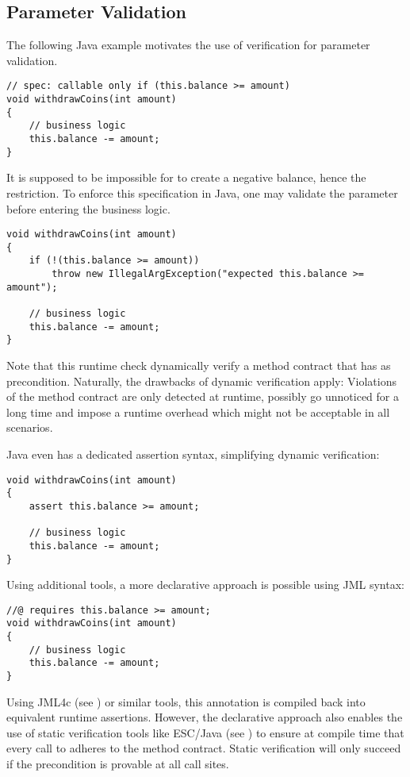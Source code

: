 
\subsection{Parameter Validation}
\label{ssec:argument-validation}
The following Java example motivates the use of verification for parameter validation.
\begin{lstlisting}
// spec: callable only if (this.balance >= amount)
void withdrawCoins(int amount)
{
    // business logic
    this.balance -= amount;
}
\end{lstlisting}
It is supposed to be impossible for  to create a negative balance, hence the restriction.
To enforce this specification in Java, one may validate the parameter  before entering the business logic.
\begin{lstlisting}
void withdrawCoins(int amount)
{
    if (!(this.balance >= amount))
        throw new IllegalArgException("expected this.balance >= amount");
        
    // business logic
    this.balance -= amount;
}
\end{lstlisting}

Note that this runtime check dynamically verify a method contract that has  as precondition.
Naturally, the drawbacks of dynamic verification apply:
Violations of the method contract are only detected at runtime, possibly go unnoticed for a long time and impose a runtime overhead which might not be acceptable in all scenarios.

Java even has a dedicated assertion syntax, simplifying dynamic verification:
\begin{lstlisting}
void withdrawCoins(int amount)
{
    assert this.balance >= amount;
    
    // business logic
    this.balance -= amount;
}
\end{lstlisting}

Using additional tools, a more declarative approach is possible using JML syntax:
\begin{lstlisting}
//@ requires this.balance >= amount;
void withdrawCoins(int amount)
{
    // business logic
    this.balance -= amount;
}
\end{lstlisting}

Using JML4c (see \cite{sarcar2010new}) or similar tools, this annotation is compiled back into equivalent runtime assertions.
However, the declarative approach also enables the use of static verification tools like ESC/Java (see \cite{leino2000esc}) to ensure at compile time that every call to  adheres to the method contract.
Static verification will only succeed if the precondition is provable at all call sites.

